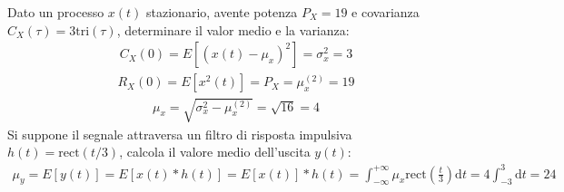 \documentclass{article}
\newcommand{\rect}{\mathrm{rect}}
\newcommand{\tri}{\mathrm{tri}}
\newcommand{\df}{\mathrm{d}}
\begin{document}
Dato un processo $x(t)$ stazionario, avente potenza $P_X=19$ e covarianza $C_X(\tau)=3\tri(\tau)$, determinare il valor medio e la varianza: 
\begin{gather}
    C_X(0)=E[(x(t)-\mu_x)^2]=\sigma_x^2=3
\end{gather}
\begin{gather*}
    R_X(0)=E[x^2(t)]=P_X=\mu_x^{(2)}=19
\end{gather*}
\begin{gather}
    \mu_x=\sqrt{\sigma_x^2-\mu_x^{(2)}}=\sqrt{16}=4
\end{gather}
Si suppone il segnale attraversa un filtro di risposta impulsiva $h(t)=\rect(t/3)$, calcola il valore medio dell'uscita $y(t)$:
\begin{gather}
    \mu_y=E[y(t)]=E[x(t)*h(t)]=E[x(t)]*h(t)=\displaystyle\int_{-\infty}^{+\infty}\mu_x\rect\left(\frac{t}{3}\right)\df t=4\int_{-3}^3\df t=24
\end{gather}
\end{document}
